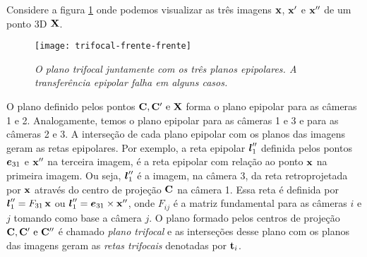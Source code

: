 Considere a figura \ref{fig.trifocal-frente} onde podemos visualizar as três imagens $\mathbf{x}$, $\mathbf{x}'$ e $\mathbf{x}''$ de um ponto 3D $\mathbf{X}$. 

\begin{figure}
\centering
\texttt{[image: trifocal-frente-frente]}
\caption{{\it O plano trifocal juntamente com os três planos epipolares. A transferência epipolar falha em alguns casos.}}
\label{fig.trifocal-frente}
\end{figure}

O plano definido pelos pontos ${\bf C}, {\bf C}' \,\,\text{e}\,\, \mathbf{X}$ forma o plano epipolar para as câmeras 1 e 2. Analogamente, temos o plano epipolar para as câmeras 1 e 3 e para as câmeras 2 e 3. A interseção de cada plano epipolar com os planos das imagens geram as retas epipolares. Por exemplo, a reta  epipolar $\boldsymbol{l}''_1$ definida pelos pontos $\boldsymbol{e}_{31}$ e $\mathbf{x}''$ na terceira imagem, é a reta epipolar com relação ao ponto $\mathbf{x}$ na primeira imagem. Ou seja, $\boldsymbol{l}''_1$ é a imagem, na câmera 3, da reta retroprojetada por $\mathbf{x}$ através do centro de projeção ${\bf C}$ na câmera 1. Essa reta é definida por $\boldsymbol{l}''_1=F_{31}\,\mathbf{x}$ ou $\boldsymbol{l}''_1=\boldsymbol{e}_{31}\times\mathbf{x}''$, onde $F_{ij}$ é a matriz fundamental para as câmeras $i$ e $j$ tomando como base a câmera $j$. O plano formado pelos centros de projeção ${\bf C}, {\bf C}' \,\,\text{e}\,\, {\bf C}''$ é chamado {\it plano trifocal} e as interseções desse plano com os planos das imagens geram as {\it retas trifocais} denotadas por ${\bf t}_i$.

